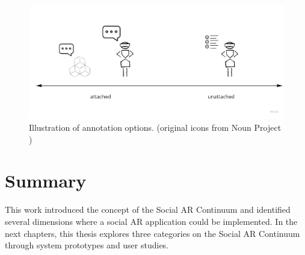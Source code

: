 
\begin{figure}[ht]
    \centering
    \includegraphics[width=0.8\linewidth]{images/30-continuum/continuum-annotation-2.jpg}
    \caption{Illustration of annotation options. (original icons from Noun Project \cite{TheNounProjectInc.})}
    \label{fig:continuum:data-annotation}
\end{figure}







\section{Summary}

This work introduced the concept of the Social AR Continuum and identified several dimensions where a social AR application could be implemented.
In the next chapters, 
this thesis explores three categories on the Social AR Continuum through system prototypes and user studies.


